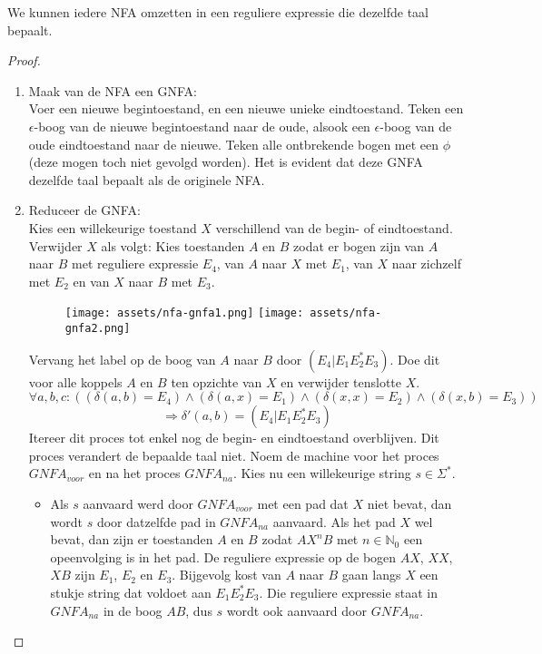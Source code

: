 \documentclass[main.tex]{subfiles}
\begin{document}
\begin{st}
  \label{st:nfa-naar-regex}
  We kunnen iedere NFA omzetten in een reguliere expressie die dezelfde taal bepaalt.
  
  \begin{proof}
    \begin{enumerate}
    \item Maak van de NFA een GNFA:\\
      Voer een nieuwe begintoestand, en een nieuwe unieke eindtoestand.
      Teken een $\epsilon$-boog van de nieuwe begintoestand naar de oude, alsook een $\epsilon$-boog van de oude eindtoestand naar de nieuwe.
      Teken alle ontbrekende bogen met een $\phi$ (deze mogen toch niet gevolgd worden).
      Het is evident dat deze GNFA dezelfde taal bepaalt als de originele NFA.
    \item Reduceer de GNFA:\\
      Kies een willekeurige toestand $X$ verschillend van de begin- of eindtoestand.
      Verwijder $X$ als volgt: Kies toestanden $A$ en $B$ zodat er bogen zijn van $A$ naar $B$ met reguliere expressie $E_{4}$, van $A$ naar $X$ met $E_{1}$, van $X$ naar zichzelf met $E_{2}$ en van $X$ naar $B$ met $E_{3}$.
      \begin{figure}[H]
        \centering
        \texttt{[image: assets/nfa-gnfa1.png]}
        \texttt{[image: assets/nfa-gnfa2.png]}   
        \label{fig:nfa-gnfa}
      \end{figure}
      Vervang het label op de boog van $A$ naar $B$ door $(E_{4}|E_{1}E_{2}^{*}E_{3})$.
      Doe dit voor alle koppels $A$ en $B$ ten opzichte van $X$ en verwijder tenslotte $X$.
      \[
      \forall a,b,c: ((\delta(a,b)=E_{4})\wedge (\delta(a,x)=E_{1})\wedge (\delta(x,x)=E_{2})\wedge (\delta(x,b)=E_{3})) 
      \]
      \[
      \Rightarrow \delta'(a,b)=(E_{4}|E_{1}E_{2}^{*}E_{3})
      \]
      Itereer dit proces tot enkel nog de begin- en eindtoestand overblijven.
      Dit proces verandert de bepaalde taal niet.
      Noem de machine voor het proces $GNFA_{voor}$ en na het proces $GNFA_{na}$.
      Kies nu een willekeurige string $s \in \Sigma^{*}$.
      \begin{itemize}
      \item
        Als $s$ aanvaard werd door $GNFA_{voor}$ met een pad dat $X$ niet bevat, dan wordt $s$ door datzelfde pad in $GNFA_{na}$ aanvaard.
        Als het pad $X$ wel bevat, dan zijn er toestanden $A$ en $B$ zodat $AX^{n}B$ met $n\in \mathbb{N}_{0}$ een opeenvolging is in het pad. De reguliere expressie op de bogen $AX$, $XX$, $XB$ zijn $E_{1}$, $E_{2}$ en $E_{3}$. Bijgevolg kost van $A$ naar $B$ gaan langs $X$ een stukje string dat voldoet aan $E_{1}E_{2}^{*}E_{3}$. Die reguliere expressie staat in $GNFA_{na}$ in de boog $AB$, dus $s$ wordt ook aanvaard door $GNFA_{na}$.

\end{itemize}
\end{enumerate}
\end{proof}
\end{st}
\end{document}
